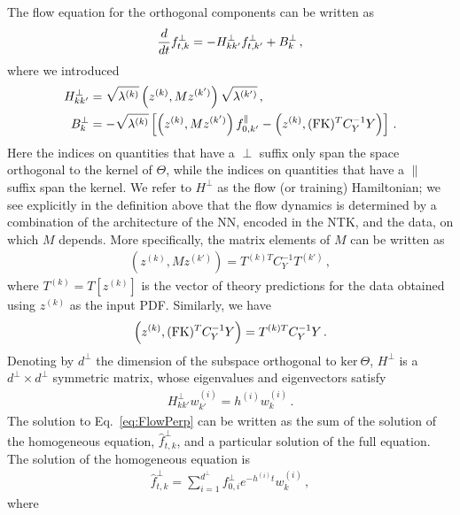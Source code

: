 The flow equation for the orthogonal components can be written as
\begin{align}
    \label{eq:FlowPerp}
    \frac{d}{dt} f^\perp_{t,k} = - H^\perp_{kk'} f^\perp_{t,k'}
        + B^\perp_{k}\, ,
\end{align}
where  we introduced
\begin{align}
    H^\perp_{kk'} &= \sqrt{\lambda^{(k)}} \left(z^{(k)}, M z^{(k')}\right) \sqrt{\lambda^{(k')}}\, ,\\
    B^\perp_k &= -\sqrt{\lambda^{(k)}} \left[\left(z^{(k)}, M z^{(k')}\right) f^\parallel_{0,k'}
        - \left(z^{(k)}, (\mathrm{FK})^T C_Y^{-1} Y\right)\right]\, .
\end{align}
Here the indices on quantities that have a $\perp$ suffix only span the space
orthogonal to the kernel of $\Theta$, while the indices on quantities that have
a $\parallel$ suffix span the kernel. We refer to $H^\perp$ as the flow (or
training) Hamiltonian; we see explicitly in the definition above that the flow
dynamics is determined by a combination of the architecture of the NN, encoded
in the NTK, and the data, on which $M$ depends. More specifically, the matrix
elements of $M$ can be written as
\begin{align}
    \label{eq:MMatElems}
    \left(z^{(k)}, M z^{(k')}\right) = T^{(k)T} C_Y^{-1} T^{(k')}\, ,
\end{align}
where $T^{(k)} = T[z^{(k)}]$ is the vector of theory predictions for the data
obtained using $z^{(k)}$ as the input PDF. Similarly, we have
\begin{align}
    \label{eq:BMatElems}
    \left(z^{(k)}, (\mathrm{FK})^T C_Y^{-1} Y\right) = T^{(k)T} C_Y^{-1} Y\, .
\end{align}
Denoting by $d^\perp$ the dimension of the subspace orthogonal to $\text{ker}\
\Theta$, $H^\perp$ is a $d^\perp\times d^\perp$ symmetric matrix, whose
eigenvalues and eigenvectors satisfy
\begin{align}
    H^\perp_{kk'} w^{(i)}_{k'} = h^{(i)} w^{(i)}_{k}\, .
\end{align}
The solution to Eq.~\eqref{eq:FlowPerp} can be written as the sum of the
solution of the homogeneous equation, $\hat{f}^{\perp}_{t,k}$, and a particular
solution of the full equation. The solution of the homogeneous equation is
\begin{align}
    \label{eq:HomoSoln}
    \hat{f}^{\perp}_{t,k} = \sum_{i=1}^{d^\perp} f^{\perp}_{0,i} e^{-h^{(i)}t} w^{(i)}_k\, ,
\end{align}
where
